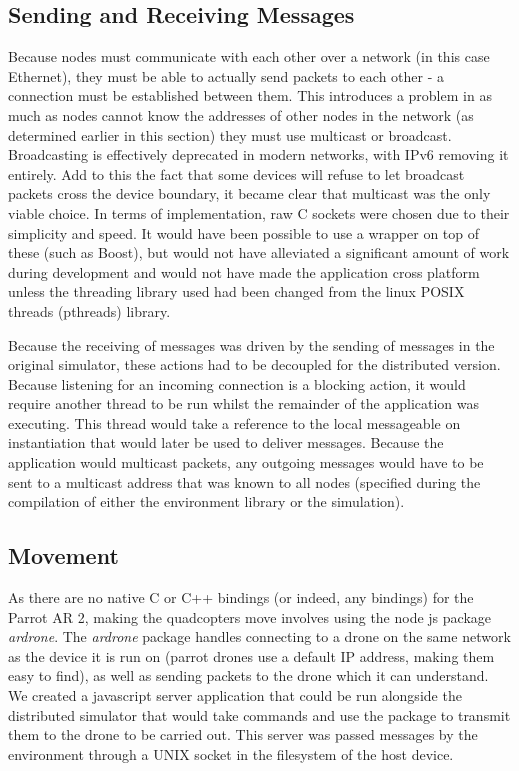 \subsection{Sending and Receiving Messages}
Because nodes must communicate with each other over a network (in this case Ethernet), they must be able to actually send packets to each other - a connection must be established between them. This introduces a problem in as much as nodes cannot know the addresses of other nodes in the network (as determined earlier in this section) they must use multicast or broadcast. Broadcasting is effectively deprecated in modern networks, with IPv6 removing it entirely. Add to this the fact that some devices will refuse to let broadcast packets cross the device boundary, it became clear that multicast was the only viable choice. In terms of implementation, raw C sockets were chosen due to their simplicity and speed. It would have been possible to use a wrapper on top of these (such as Boost), but would not have alleviated a significant amount of work during development and would not have made the application cross platform unless the threading library used had been changed from the linux POSIX threads (pthreads) library.

Because the receiving of messages was driven by the sending of messages in the original simulator, these actions had to be decoupled for the distributed version. Because listening for an incoming connection is a blocking action, it would require another thread to be run whilst the remainder of the application was executing. This thread would take a reference to the local messageable on instantiation that would later be used to deliver messages. Because the application would multicast packets, any outgoing messages would have to be sent to a multicast address that was known to all nodes (specified during the compilation of either the environment library or the simulation).

\subsection{Movement}
As there are no native C or C++ bindings (or indeed, any bindings) for the Parrot AR 2, making the quadcopters move involves using the node js package \textit{ardrone}. The \textit{ardrone} package handles connecting to a drone on the same network as the device it is run on (parrot drones use a default IP address, making them easy to find), as well as sending packets to the drone which it can understand. We created a javascript server application that could be run alongside the distributed simulator that would take commands and use the package to transmit them to the drone to be carried out. This server was passed messages by the environment through a UNIX socket in the filesystem of the host device.

